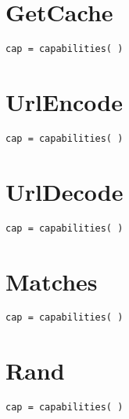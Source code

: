 \section{GetCache}
\begin{Verbatim}
cap = capabilities( )
\end{Verbatim}

\section{UrlEncode}
\begin{Verbatim}
cap = capabilities( )
\end{Verbatim}

\section{UrlDecode}
\begin{Verbatim}
cap = capabilities( )
\end{Verbatim}

\section{Matches}
\begin{Verbatim}
cap = capabilities( )
\end{Verbatim}

\section{Rand}
\begin{Verbatim}
cap = capabilities( )
\end{Verbatim}
